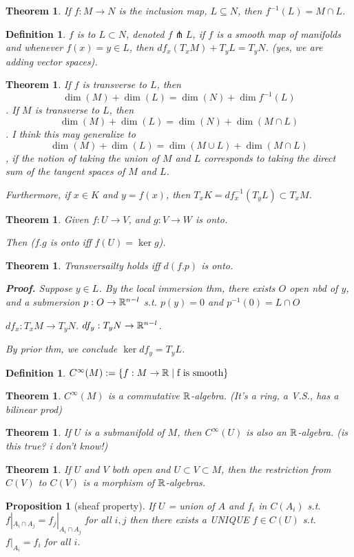 \documentclass[11pt]{amsbook}
\newenvironment{dateenv}{
	\vspace{1em}
}{
	\vspace{1em}
}
\newcommand{\mydate}[4]{
	\newdate{#1}{#2}{#3}{#4}
	\begin{dateenv}
		\hfill\displaydate{#1}
	\end{dateenv}
}
\theoremstyle{mystyle} \newtheorem{thrm}[thm]{Theorem}
\theoremstyle{mystyle} \newtheorem{defi}[thm]{Definition}
\theoremstyle{mystyle} \newtheorem{coro}[thm]{Corollary}
\theoremstyle{mystyle} \newtheorem{propo}[thm]{Proposition}
\theoremstyle{mystyle} \newtheorem{lemm}[thm]{Lemma}
\numberwithin{thm}{section}
\newcommand{\transverse}{\pitchfork}
\begin{document}
\begin{thrm}
	If $f: M \to N$ is the inclusion map, $L \subseteq N$, then $f^{-1}(L) = M \cap L$.
\end{thrm}

\begin{defi}
	$f$ is  to $L \subset N$, denoted $f \transverse L$, if $f$ is a smooth map of manifolds and whenever $f(x) = y \in L$, then $df_x(T_xM) + T_yL = T_yN$.  (yes, we are adding vector spaces).
\end{defi}

\begin{thrm}
	If $f$ is transverse to $L$, then $$\dim(M) + \dim(L) = \dim(N) + \dim f^{-1}(L)$$.
	If $M$ is transverse to $L$, then $$\dim(M) + \dim(L) = \dim(N) + \dim(M \cap L)$$.
	I think this may generalize to $$\dim(M) + \dim(L) = \dim(M \cup L) + \dim(M \cap L)$$, if the notion of taking the union of $M$ and $L$ corresponds to taking the direct sum of the tangent spaces of $M$ and $L$.

	Furthermore, if $x \in K$ and $y = f(x)$, then $T_x K = df^{-1}_x(T_y L) \subset T_x M$.
\end{thrm}

\begin{thrm}
	Given $f : U \to V$, and
	$g : V \to W$ is onto.

	Then ($f.g$ is onto iff $f(U) = \ker g$).
\end{thrm}

\begin{thrm}
	Transversailty holds iff $d(f.p)$ is onto.

	\textbf{Proof.}
	Suppose $y \in L$.
	By the local immersion thm,
	there exists $O$ open nbd of $y$, and a submersion $p : O \to {\mathbb R}^{n-l}$
	s.t. $p(y) = 0$ and $p^{-1}(0) = L \cap O$

	$df_x : T_xM \to T_yN$.
	$df_y : T_yN \to {\mathbb R}^{n-l}$.

	By prior thm, we conclude $\ker df_y = T_yL$.
\end{thrm}

\mydate{d4}{5}{10}{2016}

\begin{defi}
	$C^\infty(M) := \{ f:M \to {\mathbb R} \mid \text{f is smooth} \}$
\end{defi}
\begin{thrm}
	$C^\infty(M)$ is a commutative ${\mathbb R}$-algebra. (It's a ring, a V.S., has a bilinear prod)
\end{thrm}
\begin{thrm}
	If $U$ is a submanifold of $M$, then $C^\infty(U)$ is also an ${\mathbb R}$-algebra.
	(is this true?  i don't know!)
\end{thrm}
\begin{thrm}
	If $U$ and $V$ both open and $U \subset V \subset M$, then
	the restriction from $C(V)$ to $C(V)$ is a morphism of ${\mathbb R}$-algebras.
\end{thrm}
\begin{propo}[sheaf property]
	If $U$ = union of $A$
	and $f_i$ in $C(A_i)$ s.t. $f|_{A_i \cap A_j} = f_j|_{A_i \cap A_j}$ for all $i, j$
	then there exists a UNIQUE $f \in C(U)$ s.t. $f|_{A_i} = f_i$ for all $i$.
\end{propo}
\end{document}
